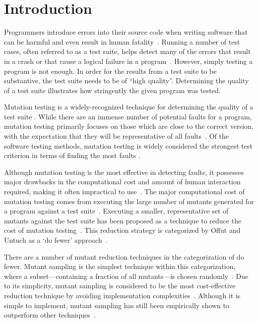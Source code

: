 
\section{Introduction}

Programmers introduce errors into their source code when writing software
that can be harmful and even result in human fatality~\cite{vicente2003programming}.
Running a number of test cases, often referred to as a test suite, helps detect many of the errors
that result in a crash or that cause a logical failure in a program~\cite{wagner2005comparing}.
However, simply testing a program is not enough. In order for the results
from a test suite to be substantive, the test suite needs to be of ``high quality''.
Determining the quality of a test suite illustrates how stringently the given
program was tested.

Mutation testing is a widely-recognized technique for determining the quality
of a test suite \cite{gopinath2015mutation}. While there are an immense number
of potential faults for a program, mutation testing primarily focuses on those
which are close to the correct version, with the expectation that they will
be representative of all faults~\cite{jia2011analysis}.
Of the software testing methods, mutation testing is widely considered the strongest
test criterion in terms of finding the most faults \cite{ammann2008introduction}.

Although mutation testing is the most effective in detecting faults, it possesses
major drawbacks in the computational cost and amount of human interaction required, making it
often impractical to use~\cite{gopinath2015mutation, wong1995reducing, gopinath2015empirical}.
The major computational cost of mutation testing comes from executing the large number of mutants generated for a
program against a test suite~\cite{offutt1993experimental}. Executing a smaller, representative
set of mutants against the test suite has been proposed as a technique to reduce
the cost of mutation testing~\cite{jia2011analysis, wong1995reducing, offutt1993experimental, offutt2001mutation}.
This reduction strategy is categorized by Offut and Untuch as a `do fewer' approach~\cite{offutt2001mutation}.

There are a number of mutant reduction techniques in the categorization of do fewer.
Mutant sampling is the simplest technique within this categorization, where a
subset---containing a fraction of all mutants---is chosen randomly~\cite{wong1995reducing}.
Due to its simplicity, mutant sampling is considered to be the most cost-effective
reduction technique by avoiding implementation complexities~\cite{gopinath2015mutation}.
Although it is simple to implement, mutant sampling has still been empirically shown
to outperform other techniques~\cite{zhang2010operator}.


